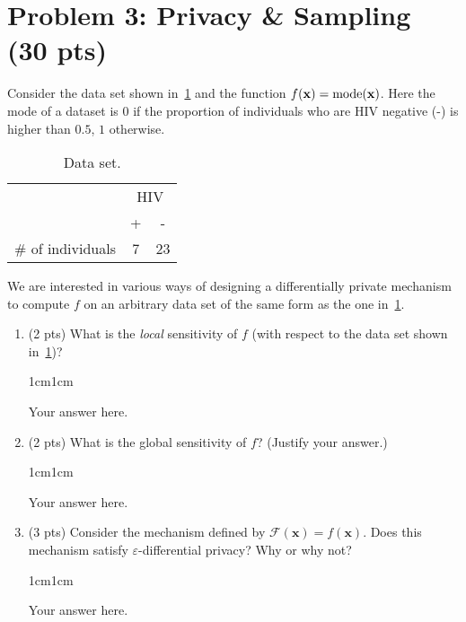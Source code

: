 \documentclass[11pt,letterpaper]{article}
\newenvironment{answer}{\em \color{blue} \begin{adjustwidth}{1cm}{1cm}}{\end{adjustwidth}}
\newcommand{\mc}[1]{\mathcal{#1}}	%
\newcommand{\rv}[1]{\mathbf{#1}}    %
\begin{document}
\section*{Problem 3: Privacy \& Sampling (30 pts)}
%
Consider the data set shown in~\cref{tbl:pr3data} and the function $f(\rv{x}) = {\rm mode}(\rv{x})$. Here the mode of a dataset is $0$ if the proportion of individuals who are HIV negative (-) is higher than $0.5$, $1$ otherwise.
%
\begin{table}[h]
	\centering
	\begin{tabular}{l|c|c|}
	\cline{2-3}
	                                        & \multicolumn{2}{c|}{HIV} \\ \cline{2-3} \cline{2-3} 
	                                        & +          & -           \\ \hline
	\multicolumn{1}{|c|}{\# of individuals} & 7          & 23          \\ \hline
	\end{tabular}
	\caption{Data set.}
	\label{tbl:pr3data}
\end{table}
%

We are interested in various ways of designing a differentially private mechanism to compute $f$ on an arbitrary data set of the same form as the one in~\cref{tbl:pr3data}. 

%
\begin{enumerate}
%
	\item (2 pts) What is the {\em local} sensitivity of $f$ (with respect to the data set shown in~\cref{tbl:pr3data})? 
	
	\begin{answer}
	
		Your answer here.
		
	\end{answer}
	
		\item (2 pts) What is the global sensitivity of $f$? (Justify your answer.)
	
	\begin{answer}
	
		Your answer here.
		
	\end{answer}

	\item (3 pts) Consider the mechanism defined by $\mc{F}(\rv{x}) = f(\rv{x})$. Does this mechanism satisfy $\varepsilon$-differential privacy? Why or why not?
	
	\begin{answer}
	
		Your answer here.
		
	\end{answer}
	
%
\end{enumerate}
\end{document}
